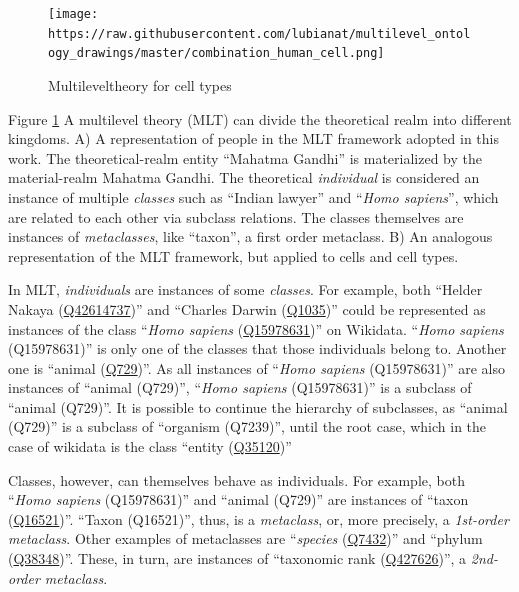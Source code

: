 \begin{figure}
\hypertarget{fig:multilevel}{%
\centering
\texttt{[image: https://raw.githubusercontent.com/lubianat/multilevel\_ontology\_drawings/master/combination\_human\_cell.png]}
\caption{Multileveltheory for cell types}\label{fig:multilevel}
}
\end{figure}

Figure \ref{fig:multilevel} A multilevel theory (MLT) can divide the theoretical realm into different kingdoms. A) A representation of people in the MLT framework adopted in this work. The theoretical-realm entity ``Mahatma Gandhi'' is materialized by the material-realm Mahatma Gandhi. The theoretical \emph{individual} is considered an instance of multiple \emph{classes} such as ``Indian lawyer'' and ``\emph{Homo sapiens}'', which are related to each other via subclass relations. The classes themselves are instances of \emph{metaclasses}, like ``taxon'', a first order metaclass. B) An analogous representation of the MLT framework, but applied to cells and cell types.

In MLT, \emph{individuals} are instances of some \emph{classes}.
For example, both ``Helder Nakaya (\href{https://www.wikidata.org/wiki/Q42614737}{Q42614737})'' and ``Charles Darwin (\href{https://www.wikidata.org/wiki/Q42614737}{Q1035})'' could be represented as instances of the class ``\emph{Homo sapiens} (\href{https://www.wikidata.org/wiki/Q15978631}{Q15978631})'' on Wikidata.
``\emph{Homo sapiens} (Q15978631)'' is only one of the classes that those individuals belong to.
Another one is ``animal (\href{https://www.wikidata.org/wiki/Q729}{Q729})''.
As all instances of ``\emph{Homo sapiens} (Q15978631)'' are also instances of ``animal (Q729)'', ``\emph{Homo sapiens} (Q15978631)'' is a subclass of ``animal (Q729)''.
It is possible to continue the hierarchy of subclasses, as ``animal (Q729)'' is a subclass of ``organism (Q7239)'', until the root case, which in the case of wikidata is the class ``entity (\href{https://www.wikidata.org/wiki/Q35120}{Q35120})''

Classes, however, can themselves behave as individuals.
For example, both ``\emph{Homo sapiens} (Q15978631)'' and ``animal (Q729)'' are instances of ``taxon (\href{https://www.wikidata.org/wiki/Q16521}{Q16521})''.
``Taxon (Q16521)'', thus, is a \emph{metaclass}, or, more precisely, a \emph{1st-order metaclass}.
Other examples of metaclasses are ``\emph{species} (\href{https://www.wikidata.org/wiki/Q7432}{Q7432})'' and ``phylum (\href{https://www.wikidata.org/wiki/Q38348}{Q38348})''.
These, in turn, are instances of ``taxonomic rank (\href{https://www.wikidata.org/wiki/Q427626}{Q427626})'', a \emph{2nd-order metaclass}.

